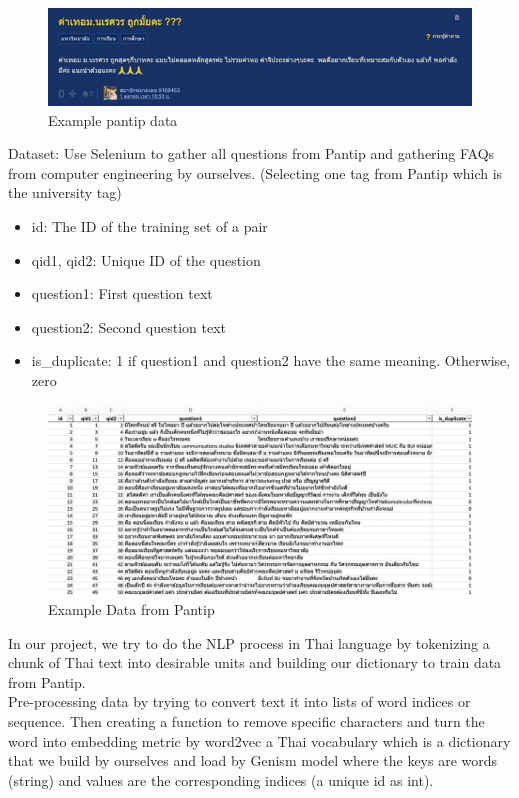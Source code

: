 \documentclass[12pt,oneside,openright,a4paper]{cpe-english-project}
\begin{document}
\begin{figure}[!h]
	\includegraphics[width=14cm]{img/ch3/Example Pantip Data.jpg}
	\caption{Example pantip data}\label{fig:Example Pantip Data}
\end{figure}

Dataset: Use Selenium to gather all questions from Pantip and gathering FAQs from computer engineering by ourselves. (Selecting one tag from Pantip which is the university tag)

\begin{itemize}
  \item id: The ID of the training set of a pair 
  \item qid1, qid2: Unique ID of the question
  \item question1: First question text
  \item question2: Second question text
  \item is\_duplicate: 1 if question1 and question2 have the same meaning. Otherwise, zero
\end{itemize}

\begin{figure}[!h]
	\includegraphics[width=14cm]{img/ch3/Example data from Pantip.jpg}
	\caption{Example Data from Pantip}\label{fig:Example Data from Pantip}
\end{figure}

In our project, we try to do the NLP process in Thai language by tokenizing a chunk of Thai text into desirable units and building our dictionary to train data from Pantip.\\
\label{preprocessing cosine}
Pre-processing data by trying to convert text it into lists of word indices or sequence. Then creating a function to remove specific characters and turn the word into embedding metric by word2vec a Thai vocabulary which is a dictionary that we build by ourselves and load by Genism model where the keys are words (string) and values are the corresponding indices (a unique id as int).
\end{document}
